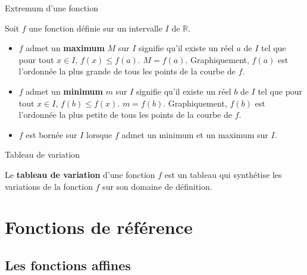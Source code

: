 \begin{pageCours}
\begin{DefT}{Extremum d'une fonction}

Soit $f$ une fonction définie sur un intervalle $I$ de $\mathbb R$. 
\begin{itemize}[leftmargin=*]
\item $f$ admet un \textbf{maximum} $M$ sur $I$ signifie qu'il existe un réel $a$ de $I$ tel que pour tout $x \in I$, $f(x)\leq f(a)$. $M=f(a)$. Graphiquement, $f(a)$ est l'ordonnée la plus grande de tous les points de la courbe de $f$.
\item $f$ admet un \textbf{minimum} $m$ sur $I$ signifie qu'il existe un réel $b$ de $I$ tel que pour tout $x \in I$, $f(b) \leq f(x)$. $m=f(b)$. Graphiquement, $f(b)$ est l'ordonnée la plus petite de tous les points de la courbe de $f$.
\item $f$ est bornée sur $I$ lorsque $f$ admet un minimum et un maximum sur $I$.
\end{itemize} 
\end{DefT} 



\begin{DefT}{Tableau de variation}
\begin{minipage}{0.45\linewidth}
Le \textbf{tableau de variation} d'une fonction $f$ est un tableau qui synthétise les variations de la fonction $f$ sur son domaine de définition.

\end{minipage}
\hfill
\begin{minipage}{0.53\linewidth}


\end{minipage}  
\end{DefT}




\section{Fonctions de référence}


\subsection{Les fonctions affines}


\end{pageCours}
